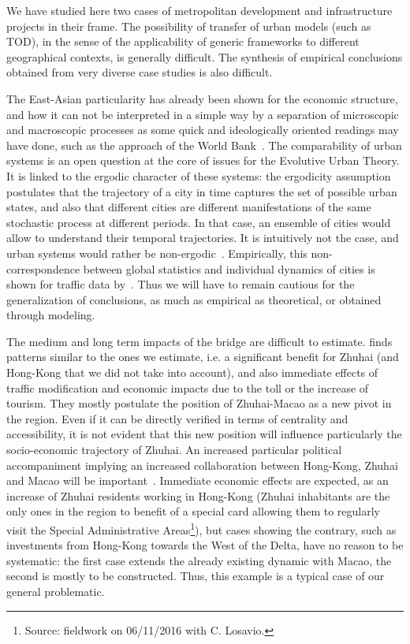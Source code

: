 We have studied here two cases of metropolitan development and infrastructure projects in their frame. The possibility of transfer of urban models (such as TOD), in the sense of the applicability of generic frameworks to different geographical contexts, is generally difficult. The synthesis of empirical conclusions obtained from very diverse case studies is also difficult.

The East-Asian particularity has already been shown for the economic structure, and how it can not be interpreted in a simple way by a separation of microscopic and macroscopic processes as some quick and ideologically oriented readings may have done, such as the approach of the World Bank~\cite{amsden1994isn}. The comparability of urban systems is an open question at the core of issues for the Evolutive Urban Theory. It is linked to the ergodic character of these systems: the ergodicity assumption postulates that the trajectory of a city in time captures the set of possible urban states, and also that different cities are different manifestations of the same stochastic process at different periods. In that case, an ensemble of cities would allow to understand their temporal trajectories. It is intuitively not the case, and urban systems would rather be non-ergodic~\cite{pumain2012urban}. Empirically, this non-correspondence between global statistics and individual dynamics of cities is shown for traffic data by~\cite{2017arXiv171009559D}. Thus we will have to remain cautious for the generalization of conclusions, as much as empirical as theoretical, or obtained through modeling.



The medium and long term impacts of the bridge are difficult to estimate. \cite{wu2012impact} finds patterns similar to the ones we estimate, i.e. a significant benefit for Zhuhai (and Hong-Kong that we did not take into account), and also immediate effects of traffic modification and economic impacts due to the toll or the increase of tourism. They mostly postulate the position of Zhuhai-Macao as a new pivot in the region. Even if it can be directly verified in terms of centrality and accessibility, it is not evident that this new position will influence particularly the socio-economic trajectory of Zhuhai. An increased particular political accompaniment implying an increased collaboration between Hong-Kong, Zhuhai and Macao will be important~\cite{zhou2016medium}. Immediate economic effects are expected, as an increase of Zhuhai residents working in Hong-Kong (Zhuhai inhabitants are the only ones in the region to benefit of a special card allowing them to regularly visit the Special Administrative Areas\footnote{Source: fieldwork on 06/11/2016 with C. Losavio.}), but cases showing the contrary, such as investments from Hong-Kong towards the West of the Delta, have no reason to be systematic: the first case extends the already existing dynamic with Macao, the second is mostly to be constructed. Thus, this example is a typical case of our general problematic.






